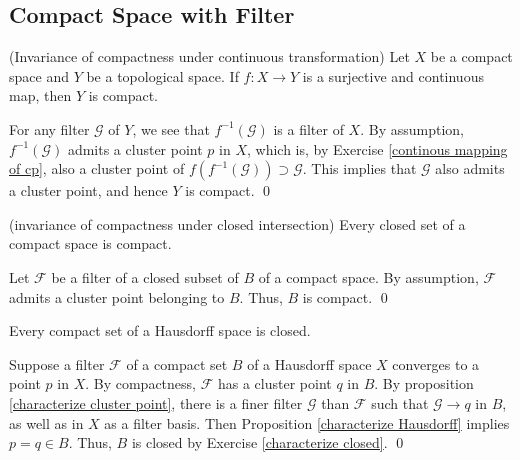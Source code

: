 \documentclass{report}
\begin{document}
\subsection{Compact Space with Filter} \label{compact space with filter}

\begin{prp}\label{invariance of compactness under ctn} (Invariance of compactness under continuous transformation)
    Let \( X \) be a compact space and \( Y \) be a topological space.
    If \( f:X \to Y \) is a surjective and continuous map, then \( Y \) is compact.
\end{prp}
\begin{prf}
    For any filter \( \mathscr{G} \) of \( Y \), we see that \( f^{-1}(\mathscr{G}) \) is a filter of \( X \). By assumption, \( f^{-1}(\mathscr{G}) \) admits a cluster point \( p \) in \( X \), which is, by Exercise \ref{continous mapping of cp}, also a cluster point of \( f(f^{-1}(\mathscr{G})) \supset \mathscr{G}\). This implies that \( \mathscr{G} \) also admits a cluster point, and hence \( Y \) is compact.
    \qed\end{prf}

\begin{prp}\label{invariance of compactness under closed intersection} (invariance of compactness under closed intersection)
    Every closed set of a compact space is compact.
\end{prp}
\begin{prf}
    Let \( \mathscr{F} \) be a filter of a closed subset of \( B \) of a compact space. By assumption, \( \mathscr{F} \) admits a cluster point belonging to \( B \). Thus, \( B \) is compact.
    \qed\end{prf}

\begin{prp}\label{compact -> closed if Hausdorff}
    Every compact set of a Hausdorff space is closed.
\end{prp}

\begin{prf}
    Suppose a filter \( \mathscr{F} \) of a compact set \( B \) of a Hausdorff space \( X \) converges to a point \( p \) in \( X \). By compactness, \( \mathscr{F} \) has a cluster point \( q \) in \( B \). By proposition \ref{characterize cluster point}, there is a finer filter \( \mathscr{G} \) than \( \mathscr{F} \) such that \( \mathscr{G} \to q \) in \( B \), as well as in \( X \) as a filter basis. Then Proposition \ref{characterize Hausdorff} implies \( p =q \in B \). Thus, \( B \) is closed by Exercise \ref{characterize closed}.
    \qed\end{prf}
\end{document}
